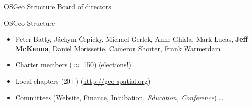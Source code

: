 \documentclass[xcolor=dvipsnames]{beamer}
\begin{document}
\begin{frame}{OSGeo Structure}
    Board of directors
    \begin{center}
    \end{center}

\end{frame}
\begin{frame}{OSGeo Structure}
\begin{itemize}
    \item Peter Batty, Jáchym Čepický, Michael Gerlek, Anne Ghisla, Mark Lucas,
        {\bf Jeff McKenna}, Daniel Morissette, Cameron Shorter, Frank Warmerdam
    \item Charter members ($\approx$ 150) (elections!)
            \pause
        \item Local chapters (20+) (\url{http://geo-spatial.org})
            \pause
    \item Committees (Website, Finance, Incubation, {\em Education, Conference})
        \dots
\end{itemize}
\end{frame}
\end{document}
